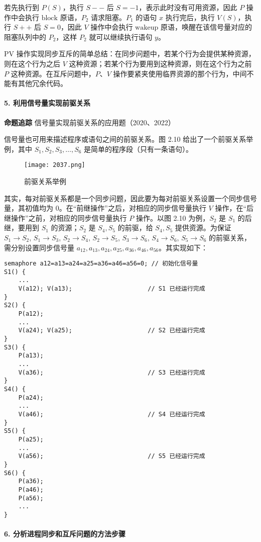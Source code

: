 \documentclass{ctexbook}
\begin{document}
若先执行到 $P(S)$，执行 $S--$ 后 $S=-1$，表示此时没有可用资源，因此 $P$ 操作中会执行 $\text{block}$ 原语，$P_2$ 请求阻塞。$P_1$ 的语句 $x$ 执行完后，执行 $V(S)$，执行 $S++$ 后 $S=0$，因此 $V$ 操作中会执行 $\text{wakeup}$ 原语，唤醒在该信号量对应的阻塞队列中的 $P_2$，这样 $P_2$ 就可以继续执行语句 $y$。

PV 操作实现同步互斥的简单总结：在同步问题中，若某个行为会提供某种资源，则在这个行为之后 $V$ 这种资源；若某个行为要用到这种资源，则在这个行为之前 $P$ 这种资源。在互斥问题中，$P$、$V$ 操作要紧夹使用临界资源的那个行为，中间不能有其他冗余代码。

\paragraph{5. 利用信号量实现前驱关系}

\textbf{命题追踪} 信号量实现前驱关系的应用题（2020、2022）

信号量也可用来描述程序或语句之间的前驱关系。图 2.10 给出了一个前驱关系举例，其中 $S_1, S_2, S_3, \dots, S_6$ 是简单的程序段（只有一条语句）。

\begin{figure}[h]
	\centering
	\texttt{[image: 2037.png]}
	\caption{前驱关系举例}
	\label{fig:precedence_relationship}
\end{figure}

其实，每对前驱关系都是一个同步问题，因此要为每对前驱关系设置一个同步信号量，其初值均为 0。在“前继操作”之后，对相应的同步信号量执行 $V$ 操作，在“后继操作”之前，对相应的同步信号量执行 $P$ 操作。以图 2.10 为例，$S_2$ 是 $S_1$ 的后继，要用到 $S_1$ 的资源；$S_2$ 是 $S_4, S_5$ 的前驱，给 $S_4, S_5$ 提供资源。为保证 $S_1 \to S_2$, $S_1 \to S_3$, $S_2 \to S_4$, $S_2 \to S_5$, $S_3 \to S_6$, $S_4 \to S_6$, $S_5 \to S_6$ 的前驱关系，需分别设置同步信号量 $a_{12}, a_{13}, a_{24}, a_{25}, a_{36}, a_{46}, a_{56}$。其实现如下：

\begin{lstlisting}
semaphore a12=a13=a24=a25=a36=a46=a56=0; // 初始化信号量
S1() {
	...
	V(a12); V(a13);                     // S1 已经运行完成
}
S2() {
	P(a12);
	...
	V(a24); V(a25);                     // S2 已经运行完成
}
S3() {
	P(a13);
	...
	V(a36);                             // S3 已经运行完成
}
S4() {
	P(a24);
	...
	V(a46);                             // S4 已经运行完成
}
S5() {
	P(a25);
	...
	V(a56);                             // S5 已经运行完成
}
S6() {
	P(a36);
	P(a46);
	P(a56);
	...
}
\end{lstlisting}
\paragraph{6. 分析进程同步和互斥问题的方法步骤}
\end{document}
